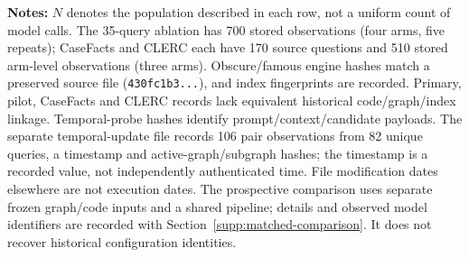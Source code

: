 \footnotesize\raggedright\textbf{Notes:} $N$ denotes the population described in each row, not a uniform count of model calls. The 35-query ablation has 700 stored observations (four arms, five repeats); CaseFacts and CLERC each have 170 source questions and 510 stored arm-level observations (three arms). Obscure/famous engine hashes match a preserved source file (\texttt{430fc1b3...}), and index fingerprints are recorded. Primary, pilot, CaseFacts and CLERC records lack equivalent historical code/graph/index linkage. Temporal-probe hashes identify prompt/context/candidate payloads. The separate temporal-update file records 106 pair observations from 82 unique queries, a timestamp and active-graph/subgraph hashes; the timestamp is a recorded value, not independently authenticated time. File modification dates elsewhere are not execution dates. The prospective comparison uses separate frozen graph/code inputs and a shared pipeline; details and observed model identifiers are recorded with Section~\ref{supp:matched-comparison}. It does not recover historical configuration identities.
\par\endgroup
